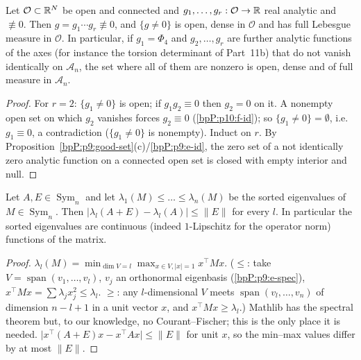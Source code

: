 \begin{lemma}\label{bpP:p10:generic}
Let $\mathcal O\subset\mathbb{R}^N$ be open and connected and $g_1,\dots,g_r:\mathcal O\to\mathbb{R}$ real analytic and $\not\equiv0$. Then $g=g_1\cdots g_r\not\equiv0$, and $\{g\ne0\}$ is open, dense in $\mathcal O$ and has full Lebesgue measure in $\mathcal O$. In particular, if $g_1=\Phi_4$ and $g_2,\dots,g_r$ are further analytic functions of the axes (for instance the torsion determinant of Part~11b) that do not vanish identically on $\mathcal A_n$, the set where all of them are nonzero is open, dense and of full measure in $\mathcal A_n$.
\end{lemma}
\begin{proof}
\label{stepP:p10:gen-prod} For $r=2$: $\{g_1\ne0\}$ is open; if $g_1g_2\equiv0$ then $g_2=0$ on it. A nonempty open set on which $g_2$ vanishes forces $g_2\equiv0$ (\ref{bpP:p10:f-id}); so $\{g_1\ne0\}=\emptyset$, i.e.\ $g_1\equiv0$, a contradiction ($\{g_1\ne0\}$ is nonempty). Induct on $r$.
\label{stepP:p10:gen-zero} By Proposition~\ref{bpP:p9:good-set}(c)/\ref{bpP:p9:e-id}, the zero set of a not identically zero analytic function on a connected open set is closed with empty interior and null.
\end{proof}

\begin{lemma}\label{bpP:p10:weyl}
Let $A,E\in\operatorname{Sym}_n$ and let $\lambda_1(M)\le\dots\le\lambda_n(M)$ be the sorted eigenvalues of $M\in\operatorname{Sym}_n$. Then $\lvert\lambda_l(A+E)-\lambda_l(A)\rvert\le\lVert E\rVert$ for every $l$. In particular the sorted eigenvalues are continuous (indeed $1$-Lipschitz for the operator norm) functions of the matrix.
\end{lemma}
\begin{proof}
\label{stepP:p10:weyl-mm} $\lambda_l(M)=\min_{\dim V=l}\max_{x\in V,\lvert x\rvert=1}x^\top Mx$. ($\le$: take $V=\operatorname{span}(v_1,\dots,v_l)$, $v_j$ an orthonormal eigenbasis (\ref{bpP:p9:e-spec}), $x^\top Mx=\sum\lambda_jx_j^2\le\lambda_l$. $\ge$: any $l$-dimensional $V$ meets $\operatorname{span}(v_l,\dots,v_n)$ of dimension $n-l+1$ in a unit vector $x$, and $x^\top Mx\ge\lambda_l$.) Mathlib has the spectral theorem but, to our knowledge, no Courant--Fischer; this is the only place it is needed.
\label{stepP:p10:weyl-pert} $\lvert x^\top(A+E)x-x^\top Ax\rvert\le\lVert E\rVert$ for unit $x$, so the min--max values differ by at most $\lVert E\rVert$.
\end{proof}

